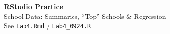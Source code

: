 \documentclass[aspectratio=169,11pt]{beamer}
\begin{document}
{
\begin{frame}
  \vfill
  \centering
  {\color{qrnavy}\Huge\bfseries RStudio Practice}\\[0.8em]
  {\color{qrblue}\large School Data: Summaries, ``Top'' Schools \& Regression}\\[0.4em]
  {\color{qrgray} See \texttt{Lab4.Rmd} / \texttt{Lab4\_0924.R}}
  \vfill
\end{frame}
}
\end{document}

